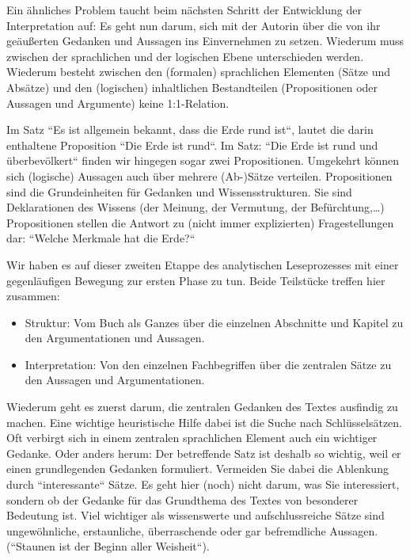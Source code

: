 \documentclass[]{book}
\providecommand{\tightlist}{%
  \setlength{\itemsep}{0pt}\setlength{\parskip}{0pt}}
\theoremstyle{definition}
\theoremstyle{definition}
\theoremstyle{definition}
\theoremstyle{remark}
\begin{document}
Ein ähnliches Problem taucht beim nächsten Schritt der Entwicklung der
Interpretation auf: Es geht nun darum, sich mit der Autorin über die von
ihr geäußerten Gedanken und Aussagen ins Einvernehmen zu setzen.
Wiederum muss zwischen der sprachlichen und der logischen Ebene
unterschieden werden. Wiederum besteht zwischen den (formalen)
sprachlichen Elementen (Sätze und Absätze) und den (logischen)
inhaltlichen Bestandteilen (Propositionen oder Aussagen und Argumente)
keine 1:1-Relation.

Im Satz ``Es ist allgemein bekannt, dass die Erde rund ist``, lautet die
darin enthaltene Proposition ``Die Erde ist rund``. Im Satz: ``Die Erde
ist rund und überbevölkert`` finden wir hingegen sogar zwei
Propositionen. Umgekehrt können sich (logische) Aussagen auch über
mehrere (Ab-)Sätze verteilen. Propositionen sind die Grundeinheiten für
Gedanken und Wissensstrukturen. Sie sind Deklarationen des Wissens (der
Meinung, der Vermutung, der Befürchtung,\ldots{}) Propositionen stellen
die Antwort zu (nicht immer explizierten) Fragestellungen dar: ``Welche
Merkmale hat die Erde?``

Wir haben es auf dieser zweiten Etappe des analytischen Leseprozesses
mit einer gegenläufigen Bewegung zur ersten Phase zu tun. Beide
Teilstücke treffen hier zusammen:

\begin{itemize}
\tightlist
\item
  Struktur: Vom Buch als Ganzes über die einzelnen Abschnitte und
  Kapitel zu den Argumentationen und Aussagen.
\item
  Interpretation: Von den einzelnen Fachbegriffen über die zentralen
  Sätze zu den Aussagen und Argumentationen.
\end{itemize}

Wiederum geht es zuerst darum, die zentralen Gedanken des Textes
ausfindig zu machen. Eine wichtige heuristische Hilfe dabei ist die
Suche nach Schlüsselsätzen. Oft verbirgt sich in einem zentralen
sprachlichen Element auch ein wichtiger Gedanke. Oder anders herum: Der
betreffende Satz ist deshalb so wichtig, weil er einen grundlegenden
Gedanken formuliert. Vermeiden Sie dabei die Ablenkung durch
``interessante`` Sätze. Es geht hier (noch) nicht darum, was Sie
interessiert, sondern ob der Gedanke für das Grundthema des Textes von
besonderer Bedeutung ist. Viel wichtiger als wissenswerte und
aufschlussreiche Sätze sind ungewöhnliche, erstaunliche, überraschende
oder gar befremdliche Aussagen. (``Staunen ist der Beginn aller
Weisheit``).
\end{document}

